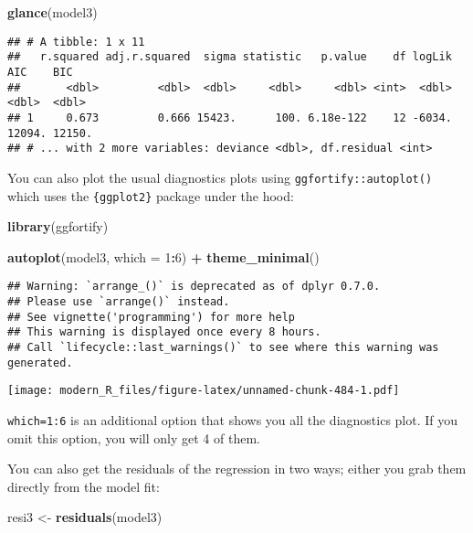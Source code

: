 \documentclass[
]{article}
\newenvironment{Shaded}{\begin{snugshade}}{\end{snugshade}}
\newcommand{\DataTypeTok}[1]{\textcolor[rgb]{0.13,0.29,0.53}{#1}}
\newcommand{\DecValTok}[1]{\textcolor[rgb]{0.00,0.00,0.81}{#1}}
\newcommand{\KeywordTok}[1]{\textcolor[rgb]{0.13,0.29,0.53}{\textbf{#1}}}
\newcommand{\NormalTok}[1]{#1}
\newcommand{\OperatorTok}[1]{\textcolor[rgb]{0.81,0.36,0.00}{\textbf{#1}}}
\newcommand{\StringTok}[1]{\textcolor[rgb]{0.31,0.60,0.02}{#1}}
\begin{document}
\begin{Shaded}
\begin{Highlighting}[]
\KeywordTok{glance}\NormalTok{(model3)}
\end{Highlighting}
\end{Shaded}

\begin{verbatim}
## # A tibble: 1 x 11
##   r.squared adj.r.squared  sigma statistic   p.value    df logLik    AIC    BIC
##       <dbl>         <dbl>  <dbl>     <dbl>     <dbl> <int>  <dbl>  <dbl>  <dbl>
## 1     0.673         0.666 15423.      100. 6.18e-122    12 -6034. 12094. 12150.
## # ... with 2 more variables: deviance <dbl>, df.residual <int>
\end{verbatim}

You can also plot the usual diagnostics plots using \texttt{ggfortify::autoplot()} which uses the
\texttt{\{ggplot2\}} package under the hood:

\begin{Shaded}
\begin{Highlighting}[]
\KeywordTok{library}\NormalTok{(ggfortify)}

\KeywordTok{autoplot}\NormalTok{(model3, }\DataTypeTok{which =} \DecValTok{1}\OperatorTok{:}\DecValTok{6}\NormalTok{) }\OperatorTok{+}\StringTok{ }\KeywordTok{theme\_minimal}\NormalTok{()}
\end{Highlighting}
\end{Shaded}

\begin{verbatim}
## Warning: `arrange_()` is deprecated as of dplyr 0.7.0.
## Please use `arrange()` instead.
## See vignette('programming') for more help
## This warning is displayed once every 8 hours.
## Call `lifecycle::last_warnings()` to see where this warning was generated.
\end{verbatim}

\texttt{[image: modern\_R\_files/figure-latex/unnamed-chunk-484-1.pdf]}

\texttt{which=1:6} is an additional option that shows you all the diagnostics plot. If you omit this
option, you will only get 4 of them.

You can also get the residuals of the regression in two ways; either you grab them directly from
the model fit:

\begin{Shaded}
\begin{Highlighting}[]
\NormalTok{resi3 \textless{}{-}}\StringTok{ }\KeywordTok{residuals}\NormalTok{(model3)}
\end{Highlighting}
\end{Shaded}
\end{document}

